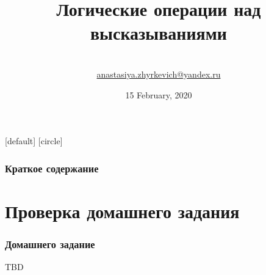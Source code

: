\documentclass[10pt]{beamer}
\title[Дискретная математика]{Логические операции над высказываниями}
\theoremstyle{remark}
\theoremstyle{definition}
\begin{document}
\author[BSU]{
	\begin{tabular}{c} 
	\Large
	\\
    \footnotesize \href{mailto:anastasiya.zhyrkevich@yandex.ru}{anastasiya.zhyrkevich@yandex.ru}
\end{tabular}
\vspace{-4ex}}


\date{15 February, 2020}

\begin{noheadline}
\begin{frame}\maketitle\end{frame}
\end{noheadline}

[default]
[circle]

\begin{frame}
	\frametitle{Краткое содержание} %
	\tableofcontents %
\end{frame}

\section{Проверка домашнего задания}
\begin{frame}[allowframebreaks]
\frametitle{Домашнего задание}

TBD

\end{frame}
\end{document}

